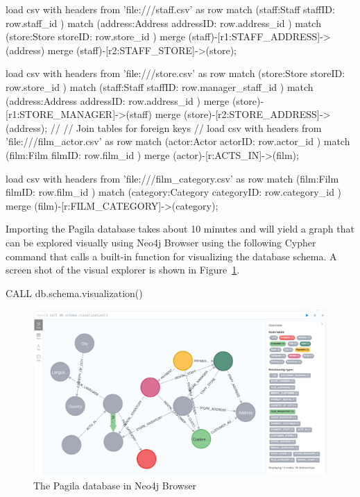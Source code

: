 \begin{cyphercode}
load csv with headers from 'file:///staff.csv' as row
match (staff:Staff {staffID: row.staff_id} )
match (address:Address {addressID: row.address_id} )
match (store:Store {storeID: row.store_id} )
merge (staff)-[r1:STAFF_ADDRESS]->(address)
merge (staff)-[r2:STAFF_STORE]->(store);

load csv with headers from 'file:///store.csv' as row
match (store:Store {storeID: row.store_id} )
match (staff:Staff {staffID: row.manager_staff_id} )
match (address:Address {addressID: row.address_id} )
merge (store)-[r1:STORE_MANAGER]->(staff)
merge (store)-[r2:STORE_ADDRESS]->(address);
//
// Join tables for foreign keys
//
load csv with headers from 'file:///film_actor.csv' as row
match (actor:Actor {actorID: row.actor_id} )
match (film:Film {filmID: row.film_id} )
merge (actor)-[r:ACTS_IN]->(film);

load csv with headers from 'file:///film_category.csv' as row
match (film:Film {filmID: row.film_id} )
match (category:Category {categoryID: row.category_id} )
merge (film)-[r:FILM_CATEGORY]->(category);
\end{cyphercode}

Importing the Pagila database takes about 10 minutes and will yield a graph that can be explored visually using Neo4j Browser using the following Cypher command that calls a built-in function for visualizing the database schema. A screen shot of the visual explorer is shown in Figure~\ref{fig:pagilagraph}.

\begin{cyphercode}
CALL db.schema.visualization()
\end{cyphercode}


\begin{figure}
\includegraphics[width=\textwidth]{screen13.png}
\caption{The Pagila database in Neo4j Browser}
\label{fig:pagilagraph}
\end{figure}

